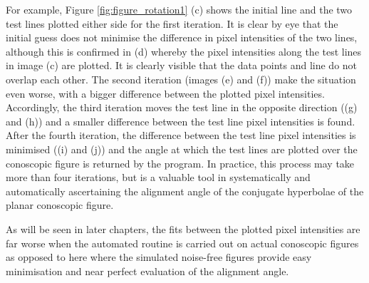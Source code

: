 For example, Figure \ref{fig:figure_rotation1} (c) shows the initial line and the two test lines plotted either side for the first iteration. It is clear by eye that the initial guess does not minimise the difference in pixel intensities of the two lines, although this is confirmed in (d) whereby the pixel intensities along the test lines in image (c) are plotted. It is clearly visible that the data points and line do not overlap each other. The second iteration (images (e) and (f)) make the situation even worse, with a bigger difference between the plotted pixel intensities. Accordingly, the third iteration moves the test line in the opposite direction ((g) and (h)) and a smaller difference between the test line pixel intensities is found. After the fourth iteration, the difference between the test line pixel intensities is minimised ((i) and (j)) and the angle at which the test lines are plotted over the conoscopic figure is returned by the program. In practice, this process may take more than four iterations, but is a valuable tool in systematically and automatically ascertaining the alignment angle of the conjugate hyperbolae of the planar conoscopic figure.

As will be seen in later chapters, the fits between the plotted pixel intensities are far worse when the automated routine is carried out on actual conoscopic figures as opposed to here where the simulated noise-free figures provide easy minimisation and near perfect evaluation of the alignment angle.

